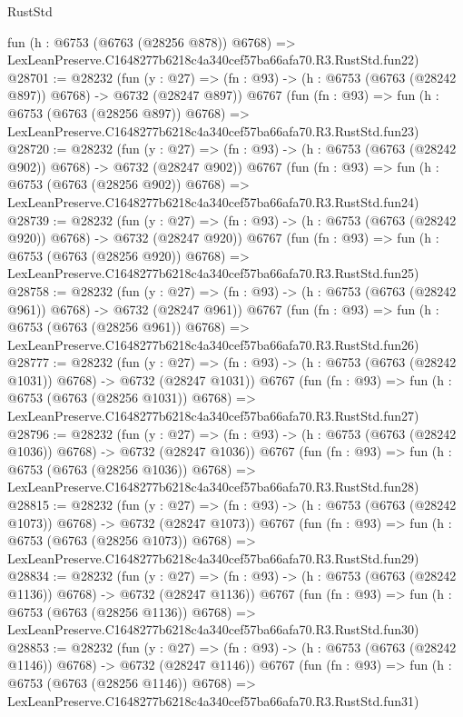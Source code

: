 \begin{lexlean}{RustStd}
\begin{coremodule}
    fun (h : @6753 (@6763 (@28256 @878)) @6768) =>
    LexLeanPreserve.C1648277b6218c4a340cef57ba66afa70.R3.RustStd.fun22)
@28701 := @28232
    (fun (y : @27) => (fn : @93) -> (h : @6753 (@6763 (@28242 @897)) @6768) -> @6732 (@28247 @897))
    @6767
    (fun (fn : @93) =>
    fun (h : @6753 (@6763 (@28256 @897)) @6768) =>
    LexLeanPreserve.C1648277b6218c4a340cef57ba66afa70.R3.RustStd.fun23)
@28720 := @28232
    (fun (y : @27) => (fn : @93) -> (h : @6753 (@6763 (@28242 @902)) @6768) -> @6732 (@28247 @902))
    @6767
    (fun (fn : @93) =>
    fun (h : @6753 (@6763 (@28256 @902)) @6768) =>
    LexLeanPreserve.C1648277b6218c4a340cef57ba66afa70.R3.RustStd.fun24)
@28739 := @28232
    (fun (y : @27) => (fn : @93) -> (h : @6753 (@6763 (@28242 @920)) @6768) -> @6732 (@28247 @920))
    @6767
    (fun (fn : @93) =>
    fun (h : @6753 (@6763 (@28256 @920)) @6768) =>
    LexLeanPreserve.C1648277b6218c4a340cef57ba66afa70.R3.RustStd.fun25)
@28758 := @28232
    (fun (y : @27) => (fn : @93) -> (h : @6753 (@6763 (@28242 @961)) @6768) -> @6732 (@28247 @961))
    @6767
    (fun (fn : @93) =>
    fun (h : @6753 (@6763 (@28256 @961)) @6768) =>
    LexLeanPreserve.C1648277b6218c4a340cef57ba66afa70.R3.RustStd.fun26)
@28777 := @28232
    (fun (y : @27) =>
    (fn : @93) -> (h : @6753 (@6763 (@28242 @1031)) @6768) -> @6732 (@28247 @1031))
    @6767
    (fun (fn : @93) =>
    fun (h : @6753 (@6763 (@28256 @1031)) @6768) =>
    LexLeanPreserve.C1648277b6218c4a340cef57ba66afa70.R3.RustStd.fun27)
@28796 := @28232
    (fun (y : @27) =>
    (fn : @93) -> (h : @6753 (@6763 (@28242 @1036)) @6768) -> @6732 (@28247 @1036))
    @6767
    (fun (fn : @93) =>
    fun (h : @6753 (@6763 (@28256 @1036)) @6768) =>
    LexLeanPreserve.C1648277b6218c4a340cef57ba66afa70.R3.RustStd.fun28)
@28815 := @28232
    (fun (y : @27) =>
    (fn : @93) -> (h : @6753 (@6763 (@28242 @1073)) @6768) -> @6732 (@28247 @1073))
    @6767
    (fun (fn : @93) =>
    fun (h : @6753 (@6763 (@28256 @1073)) @6768) =>
    LexLeanPreserve.C1648277b6218c4a340cef57ba66afa70.R3.RustStd.fun29)
@28834 := @28232
    (fun (y : @27) =>
    (fn : @93) -> (h : @6753 (@6763 (@28242 @1136)) @6768) -> @6732 (@28247 @1136))
    @6767
    (fun (fn : @93) =>
    fun (h : @6753 (@6763 (@28256 @1136)) @6768) =>
    LexLeanPreserve.C1648277b6218c4a340cef57ba66afa70.R3.RustStd.fun30)
@28853 := @28232
    (fun (y : @27) =>
    (fn : @93) -> (h : @6753 (@6763 (@28242 @1146)) @6768) -> @6732 (@28247 @1146))
    @6767
    (fun (fn : @93) =>
    fun (h : @6753 (@6763 (@28256 @1146)) @6768) =>
    LexLeanPreserve.C1648277b6218c4a340cef57ba66afa70.R3.RustStd.fun31)

\end{coremodule}
\end{lexlean}
